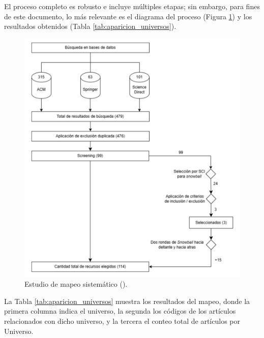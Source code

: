 El proceso completo es robusto e incluye múltiples etapas; sin embargo, para fines de este documento, lo más relevante es el diagrama del proceso (Figura \ref{fig:sms}) y los resultados obtenidos (Tabla \ref{tab:aparicion_universos}).


\begin{figure}[H]
	\centering
	\includegraphics[scale=0.4]{tablas-images/dar/resumen-mapeo.png}
	\caption{Estudio de mapeo sistemático (\SMS).}
	\label{fig:sms}
\end{figure}

La Tabla \ref{tab:aparicion_universos} muestra los resultados del mapeo, donde la primera columna indica el universo, la segunda los códigos de los artículos relacionados con dicho universo, y la tercera el conteo total de artículos por Universo.

